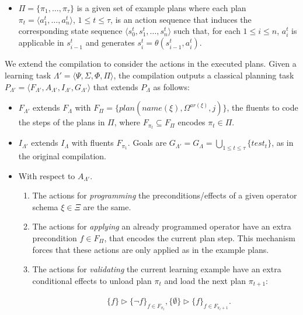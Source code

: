 \documentclass{article}
\newcommand{\tup}[1]{{\langle #1 \rangle}}
\begin{document}
\begin{itemize}
\item $\Pi=\{\pi_1,\ldots,\pi_{\tau}\}$ is a given set of example plans where each plan $\pi_t=\tup{a_1^t, \ldots, a_n^t}$, {\small $1\leq t\leq \tau$}, is an action sequence that induces the corresponding state sequence $\tup{s_0^t, s_1^t, \ldots, s_n^t}$ such that, for each {\small $1\leq i\leq n$}, $a_i^t$ is applicable in $s_{i-1}^t$ and generates $s_i^t=\theta(s_{i-1}^t,a_i^t)$.
\end{itemize}

We extend the compilation to consider the actions in the executed plans. Given a learning task $\Lambda'=\tup{\Psi,\Sigma,\Phi,\Pi}$, the compilation outputs a classical planning task $P_{\Lambda'}=\tup{F_{\Lambda'},A_{\Lambda'},I_{\Lambda'},G_{\Lambda'}}$ that extends $P_{\Lambda}$ as follows:
\begin{itemize}
\item $F_{\Lambda'}$ extends $F_{\Lambda}$ with $F_{\Pi}=\{plan(name(\xi),\Omega^{ar(\xi)},j)\}$, the fluents to code the steps of the plans in $\Pi$, where $F_{\pi_t}\subseteq F_{\Pi}$ encodes $\pi_t\in \Pi$. 
\item $I_{\Lambda'}$ extends $I_{\Lambda}$ with fluents $F_{\pi_1}$. Goals are $G_{\Lambda'}=G_{\Lambda}=\bigcup_{1\leq t\leq \tau}\{test_t\}$, as in the original compilation.
\item With respect to $A_{\Lambda'}$.
\begin{enumerate}
\item The actions for {\em programming} the preconditions/effects of a given operator schema $\xi\in\Xi$ are the same.
\item The actions for {\em applying} an already programmed operator have an extra precondition $f\in F_{\Pi}$, that encodes the current plan step. This mechanism forces that these actions are only applied as in the example plans.
\item The actions for {\em validating} the current learning example have an extra conditional effects to unload plan $\pi_{t}$ and load the next plan $\pi_{t+1}$:
\begin{small}
\begin{align*}
&\{f\}\rhd\{\neg f\}_{f\in F_{\pi_t}}, \{\emptyset\}\rhd\{f\}_{f\in F_{\pi_t+1}}.
\end{align*}
\end{small}
\end{enumerate}
\end{itemize}
\end{document}
